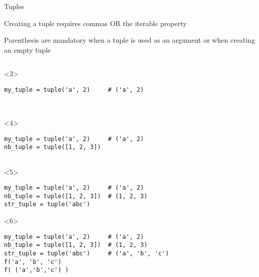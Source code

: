 \begin{frame}[fragile]{Tuples}

   Creating a tuple requires commas OR the iterable property

   Parenthesis are mandatory when a tuple is used as an argument or when creating an empty tuple

  \medskip

  \begin{center}

  \begin{columns}[onlytextwidth]
    \begin{column}{\textwidth}

      \begin{onlyenv}<3>
        \begin{lstlisting}[style=python,morekeywords={for, in, range, list}]
my_tuple = tuple('a', 2)     # ('a', 2)



 \end{lstlisting}
      \end{onlyenv}

      \begin{onlyenv}<4>
        \begin{lstlisting}[style=python,morekeywords={for, in, range, list}]
my_tuple = tuple('a', 2)     # ('a', 2)
nb_tuple = tuple([1, 2, 3])


 \end{lstlisting}
      \end{onlyenv}

      \begin{onlyenv}<5>
        \begin{lstlisting}[style=python,morekeywords={for, in, range, list}]
my_tuple = tuple('a', 2)     # ('a', 2)
nb_tuple = tuple([1, 2, 3])  # (1, 2, 3)
str_tuple = tuple('abc')

 \end{lstlisting}
      \end{onlyenv}

      \begin{onlyenv}<6>
        \begin{lstlisting}[style=python,morekeywords={for, in, range, list}]
my_tuple = tuple('a', 2)     # ('a', 2)
nb_tuple = tuple([1, 2, 3])  # (1, 2, 3)
str_tuple = tuple('abc')     # ('a', 'b', 'c')
f('a', 'b', 'c')
f( ('a','b','c') ) \end{lstlisting}
      \end{onlyenv}


\end{column}
\end{columns}
\end{center}
\end{frame}
